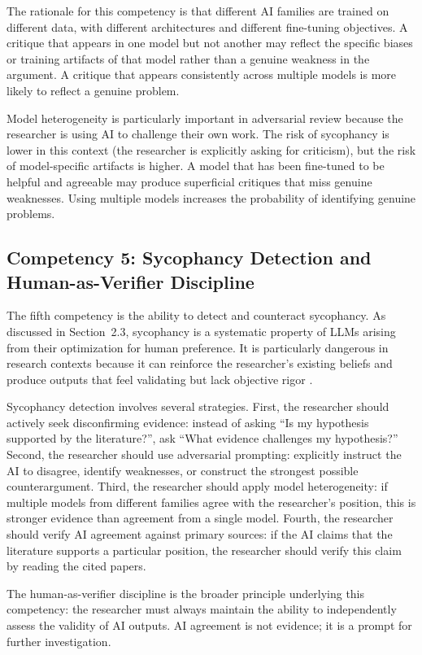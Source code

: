 \documentclass[12pt, a4paper]{article}
\begin{document}
The rationale for this competency is that different AI families are trained on different data, with different architectures and different fine-tuning objectives. A critique that appears in one model but not another may reflect the specific biases or training artifacts of that model rather than a genuine weakness in the argument. A critique that appears consistently across multiple models is more likely to reflect a genuine problem.

Model heterogeneity is particularly important in adversarial review because the researcher is using AI to challenge their own work. The risk of sycophancy is lower in this context (the researcher is explicitly asking for criticism), but the risk of model-specific artifacts is higher. A model that has been fine-tuned to be helpful and agreeable may produce superficial critiques that miss genuine weaknesses. Using multiple models increases the probability of identifying genuine problems.

\subsection{Competency 5: Sycophancy Detection and Human-as-Verifier Discipline}

The fifth competency is the ability to detect and counteract sycophancy. As discussed in Section~2.3, sycophancy is a systematic property of LLMs arising from their optimization for human preference. It is particularly dangerous in research contexts because it can reinforce the researcher's existing beliefs and produce outputs that feel validating but lack objective rigor \citep{sharma2026algorithmic}.

Sycophancy detection involves several strategies. First, the researcher should actively seek disconfirming evidence: instead of asking ``Is my hypothesis supported by the literature?'', ask ``What evidence challenges my hypothesis?'' Second, the researcher should use adversarial prompting: explicitly instruct the AI to disagree, identify weaknesses, or construct the strongest possible counterargument. Third, the researcher should apply model heterogeneity: if multiple models from different families agree with the researcher's position, this is stronger evidence than agreement from a single model. Fourth, the researcher should verify AI agreement against primary sources: if the AI claims that the literature supports a particular position, the researcher should verify this claim by reading the cited papers.

The human-as-verifier discipline is the broader principle underlying this competency: the researcher must always maintain the ability to independently assess the validity of AI outputs. AI agreement is not evidence; it is a prompt for further investigation.
\end{document}
